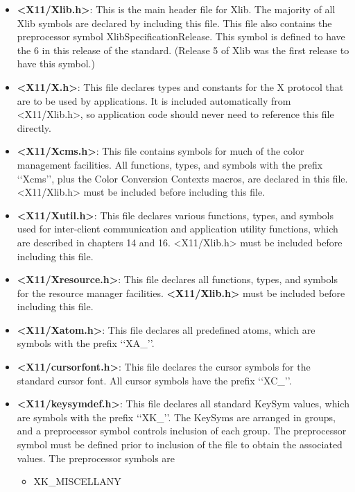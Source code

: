\documentclass{report}
\begin{document}
\begin{itemize}
            \begin{itemize}
                \item \textbf{<X11/Xlib.h>}: This is the main header file for Xlib. The majority of all Xlib symbols are declared by including this file. This file also contains the preprocessor symbol XlibSpecificationRelease. This symbol is defined to have the 6 in this release of the standard. (Release 5 of Xlib was the first release to have this symbol.)
                \item \textbf{<X11/X.h>}: This file declares types and constants for the X protocol that are to be used by applications. It is included automatically from <X11/Xlib.h>, so application code should never need to reference this file directly.
                \item \textbf{<X11/Xcms.h>}: This file contains symbols for much of the color management facilities. All functions, types, and symbols with the prefix ‘‘Xcms’’, plus the Color Conversion Contexts macros, are declared in this file. <X11/Xlib.h> must be included before including this file.
                \item \textbf{<X11/Xutil.h>}: This file declares various functions, types, and symbols used for inter-client communication and application utility functions, which are described in chapters 14 and 16. <X11/Xlib.h> must be included before including this file.
                \item \textbf{<X11/Xresource.h>}: This file declares all functions, types, and symbols for the resource manager facilities. \textbf{<X11/Xlib.h>} must be included before including this file.
                \item \textbf{<X11/Xatom.h>}: This file declares all predefined atoms, which are symbols with the prefix ‘‘XA\_’’.
                \item \textbf{<X11/cursorfont.h>}: This file declares the cursor symbols for the standard cursor font. All cursor symbols have the prefix ‘‘XC\_’’.
                \item \textbf{<X11/keysymdef.h>}: This file declares all standard KeySym values, which are symbols with the prefix ‘‘XK\_’’. The KeySyms are arranged in groups, and a preprocessor symbol controls inclusion of each group.
                    The preprocessor symbol must be defined prior to inclusion of the file to obtain the associated values. The preprocessor symbols are 
                    \begin{itemize}
                        \item XK\_MISCELLANY

\end{itemize}
\end{itemize}
\end{itemize}
\end{document}
